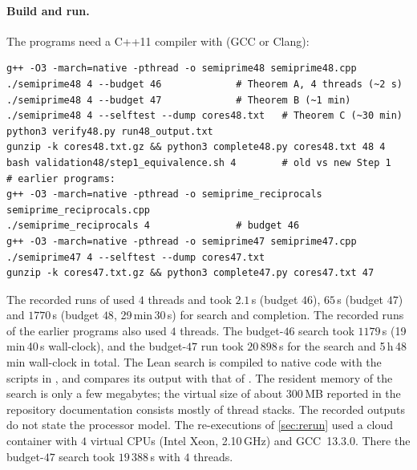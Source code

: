 \documentclass[11pt]{article}
\begin{document}
\paragraph{Build and run.}
The programs need a C++11 compiler with  (GCC or Clang):
{\small
\begin{verbatim}
g++ -O3 -march=native -pthread -o semiprime48 semiprime48.cpp
./semiprime48 4 --budget 46             # Theorem A, 4 threads (~2 s)
./semiprime48 4 --budget 47             # Theorem B (~1 min)
./semiprime48 4 --selftest --dump cores48.txt   # Theorem C (~30 min)
python3 verify48.py run48_output.txt
gunzip -k cores48.txt.gz && python3 complete48.py cores48.txt 48 4
bash validation48/step1_equivalence.sh 4        # old vs new Step 1
# earlier programs:
g++ -O3 -march=native -pthread -o semiprime_reciprocals semiprime_reciprocals.cpp
./semiprime_reciprocals 4               # budget 46
g++ -O3 -march=native -pthread -o semiprime47 semiprime47.cpp
./semiprime47 4 --selftest --dump cores47.txt
gunzip -k cores47.txt.gz && python3 complete47.py cores47.txt 47
\end{verbatim}
}
The recorded runs of  used $4$ threads and took $2.1$\,s (budget $46$), $65$\,s (budget $47$) and $1770$\,s (budget $48$, 29\,min\,30\,s) for search and completion.
The recorded runs of the earlier programs also used $4$ threads. The budget-$46$ search took $1179$\,s (19\,min\,40\,s wall-clock), and the budget-$47$ run took $20\,898$\,s for the search and 5\,h\,48\,min wall-clock in total.
The Lean search is compiled to native code with the scripts in , and  compares its output with that of .
The resident memory of the search is only a few megabytes; the virtual size of about $300$\,MB reported in the repository documentation consists mostly of thread stacks.
The recorded outputs do not state the processor model.
The re-executions of \cref{sec:rerun} used a cloud container with $4$ virtual CPUs (Intel Xeon, 2.10\,GHz) and GCC~13.3.0. There the budget-$47$ search took $19\,388$\,s with $4$ threads.
\end{document}
